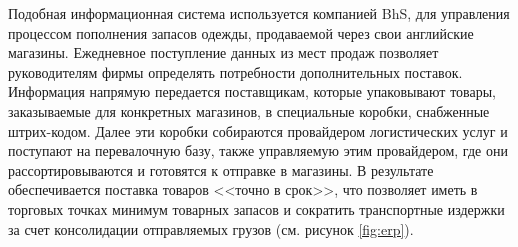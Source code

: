 Подобная информационная система используется компанией BhS, для управления процессом пополнения запасов одежды, продаваемой через свои английские магазины.
Ежедневное поступление данных из мест продаж позволяет руководителям фирмы определять потребности дополнительных поставок.
Информация напрямую передается поставщикам, которые упаковывают товары, заказываемые для конкретных магазинов, в специальные коробки, снабженные штрих-кодом.
Далее эти коробки собираются провайдером логистических услуг и поступают на перевалочную базу, также управляемую этим провайдером, где они рассортировываются и готовятся к отправке в магазины.
В результате обеспечивается поставка товаров <<точно в срок>>, что позволяет иметь в торговых точках минимум товарных запасов и сократить транспортные издержки за счет консолидации отправляемых грузов (см. рисунок \ref{fig:erp}).










